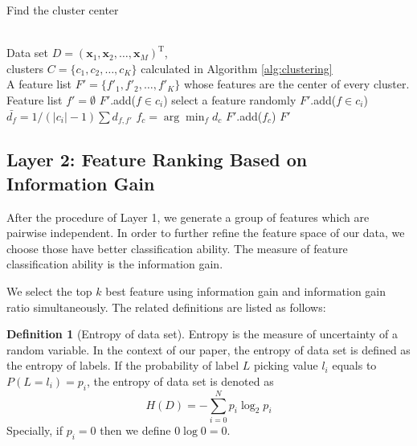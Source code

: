 \documentclass{ieeeaccess}
\theoremstyle{definition}
\newtheorem{defn}{Definition}
\begin{document}
\begin{algorithm}
\caption{Find the cluster center}
\label{alg:find-cluster-center}
\begin{algorithmic}[1]
\REQUIRE ~~\\
    Data set $D=(\bm{x}_1,\bm{x}_2,\ldots,\bm{x}_M)^\text{T}$, \\
    clusters $C=\{c_1, c_2, \ldots, c_K\}$ calculated in Algorithm \ref{alg:clustering}
\ENSURE ~~\\
    A feature list $F'=\{f'_1, f'_2, \ldots, f'_K\}$ whose features are the center of every cluster. 
\STATE Feature list $f'=\emptyset$
        \STATE $F'$.add($f \in c_i$)
            \STATE select a feature randomly
            \STATE $F'$.add($f \in c_i$)
    \ELSE
            \STATE $\bar{d_f}=1/(|c_i|-1)\sum d_{f, f'}$
        \ENDFOR
        \STATE $f_c=\arg\min_f d_c$
        \STATE $F'$.add($f_c$)
    \ENDIF
\ENDFOR
\RETURN $F'$
\end{algorithmic}
\end{algorithm}

\subsection{Layer 2: Feature Ranking Based on Information Gain}

After the procedure of Layer 1, we generate a group of features which are pairwise independent. In order to further refine the feature space of our data, we choose those have better classification ability. The measure of feature classification ability is the information gain. 

We select the top $k$ best feature using information gain and information gain ratio simultaneously. The related definitions are listed as follows:

\begin{defn}[Entropy of data set]
    Entropy\cite{Shannon1948} is the measure of uncertainty of a random variable. In the context of our paper, the entropy of data set is defined as the entropy of labels. If the probability of label $L$ picking value $l_i$ equals to $P(L=l_i)=p_i$, the entropy of data set is denoted as 
\begin{equation}
    H(D) = -\sum_{i=0}^N p_i \log_2 p_i
\end{equation}
Specially, if $p_i=0$ then we define $0\log0 = 0$. 
\end{defn}
\end{document}
